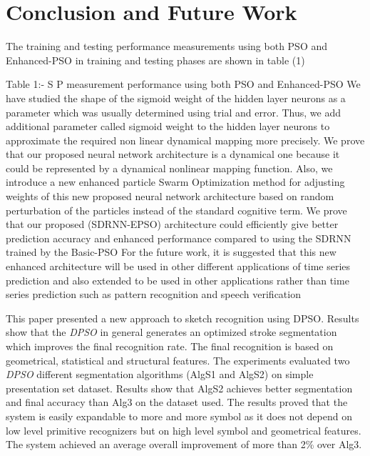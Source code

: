 \documentclass[10pt]{article}
\begin{document}
 
 
  
\section{Conclusion and Future Work}
 

The training and testing performance measurements using both PSO and Enhanced-PSO in training and testing phases are shown in table (1)

Table 1:- S P measurement performance using both PSO and Enhanced-PSO
We have studied the shape of the sigmoid weight of the hidden layer neurons as a parameter which was usually determined using trial and error. Thus, we add additional parameter called sigmoid weight to the hidden layer neurons to approximate the required non linear dynamical mapping more precisely. We prove that our proposed neural network architecture is a dynamical one because it could be represented by a dynamical nonlinear mapping function. Also, we introduce a new enhanced particle Swarm Optimization method for adjusting
weights of this new proposed neural network architecture based on random perturbation of the particles instead of the standard cognitive term. We prove that our proposed (SDRNN-EPSO) architecture could efficiently give better prediction accuracy and enhanced performance compared to using the SDRNN trained by the Basic-PSO
For the future work, it is suggested that this new enhanced architecture will be used in other different applications of time series prediction and also extended to be used in other applications rather than time series prediction such as pattern recognition and speech verification



This paper presented a new approach to sketch recognition using DPSO. Results show that the \textit{DPSO} in general generates an optimized stroke segmentation which improves the final recognition rate.  The final recognition is based on geometrical, statistical and structural features. The experiments evaluated two \textit{DPSO} different segmentation algorithms (AlgS1 and AlgS2) on simple presentation set dataset. Results show that AlgS2 achieves better segmentation and final accuracy than Alg3 \cite{earlyprocess} on the dataset used. The results proved that the system is easily expandable to more and more symbol as it does not depend on low level primitive recognizers but on high level symbol and geometrical features.  The system achieved an average overall improvement of more than 2\% over Alg3.  
\end{document}
